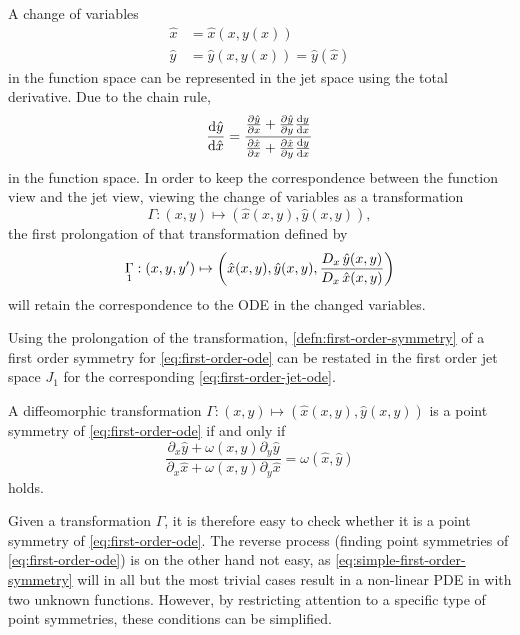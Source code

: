 A change of variables
\begin{align*}
  \hat{x} &= \hat{x}(x, y(x))\\
  \hat{y} &= \hat{y}(x, y(x)) = \hat{y}(\hat{x})
\end{align*}
in the function space can be represented in the jet space using the total derivative.
Due to the chain rule,
\begin{equation*}
  \diff{\hat{y}}{\hat{x}} = 
  \frac{\diffp{\hat{y}}{x} + \diffp{\hat{y}}{y} \diff{y}{x}}{\diffp{\hat{x}}{x} + \diffp{\hat{x}}{y} \diff{y}{x}}
\end{equation*}
in the function space.
In order to keep the correspondence between the function view and the jet view, viewing the change of variables as a transformation
\begin{equation*}
  \Gamma: \left(x,y\right) \mapsto \left(\hat{x}(x,y), \hat{y}(x,y)\right),
\end{equation*}
the first prolongation of that transformation defined by
\begin{equation*}
  \prolong{\Gamma}{1}: \left(x,y,y'\right) \mapsto \left(\hat{x}(x,y), \hat{y}(x,y), \frac{\tD{x} \hat{y}(x,y)}{\tD{x} \hat{x}(x,y)}\right)
\end{equation*}
will retain the correspondence to the ODE in the changed variables.

Using the prolongation of the transformation, \cref{defn:first-order-symmetry} of a first order symmetry for \cref{eq:first-order-ode} can be restated in the first order jet space \(J_1\) for the corresponding \cref{eq:first-order-jet-ode}.
\begin{lem} \label{lem:simple-first-order-symmetry}
  A diffeomorphic transformation \(\Gamma: \left(x,y\right) \mapsto \left(\hat{x}(x,y), \hat{y}(x,y)\right)\) is a point symmetry of \cref{eq:first-order-ode} if and only if
  \begin{equation} \label{eq:simple-first-order-symmetry}
    \frac{\partial_x \hat{y} + \omega(x,y) \partial_y \hat{y}}{\partial_x \hat{x} + \omega(x,y) \partial_y \hat{x}} = \omega(\hat{x},\hat{y})
  \end{equation}
  holds.
\end{lem}
Given a transformation \(\Gamma\), it is therefore easy to check whether it is a point symmetry of \cref{eq:first-order-ode}.
The reverse process (finding point symmetries of \cref{eq:first-order-ode}) is on the other hand not easy, as \cref{eq:simple-first-order-symmetry} will in all but the most trivial cases result in a non-linear PDE in with two unknown functions.
However, by restricting attention to a specific type of point symmetries, these conditions can be simplified.

